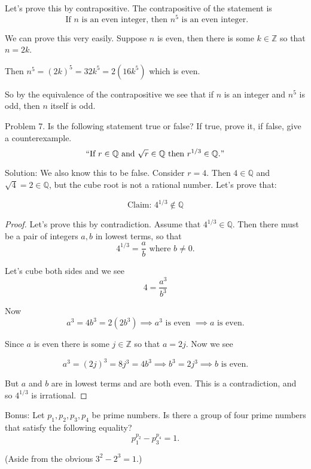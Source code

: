 \documentclass[16 pt]{amsart}
\theoremstyle{definition}
\theoremstyle{remark}
\numberwithin{equation}{subsection}
\newcommand{\Z}{\mathbb{Z}}
\newcommand{\Q}{\mathbb{Q}}
\begin{document}
Let's prove this by contrapositive.  The contrapositive of the statement is
\[
\text{ If } n \text{ is an even integer, then } n^5 \text{ is an even integer.}
\]

We can prove this very easily. Suppose $n$ is even, then there is some $k\in\Z$ so that $n=2k$.

Then $n^5 = (2k)^5 = 32k^5 = 2(16k^5)$ which is even.

So by the equivalence of the contrapositive we see that if $n$ is an integer and $n^5$ is odd, then $n$ itself is odd.


\newpage

Problem 7. Is the following statement true or false?  If true, prove it, if false, give a counterexample.
\[
\text{``If } r\in\Q \text{ and } \sqrt{r}\in\Q \text{ then } r^{1/3}\in\Q."
\]

\vspace{1in}

Solution:  We also know this to be false.  Consider $r=4$.  Then $4\in\Q$ and $\sqrt{4} = 2\in\Q$, but the cube root is not a rational number.  Let's prove that:

\[
\text{Claim: } 4^{1/3}\notin \Q
\]

\begin{proof}
Let's prove this by contradiction.  Assume that $4^{1/3}\in\Q$.  Then there must be a pair of integers $a,b$ in lowest terms, so that
\[
4^{1/3} = \frac{a}{b} \text{ where } b\ne 0.
\]


Let's cube both sides and we see
\[
4 = \frac{a^3}{b^3}
\]

Now 
\[
a^3 = 4b^3 = 2(2b^3) \implies a^3\text{ is even } \implies a \text{ is even.}
\]

Since $a$ is even there is some $j\in\Z$ so that $a=2j$.  Now we see

\[
a^3 = (2j)^3 = 8j^3 = 4b^3 \implies b^3 = 2j^3 \implies b \text{ is even}.
\]

But $a$ and $b$ are in lowest terms and are both even.  This is a contradiction, and so $4^{1/3}$ is irrational.



\end{proof}



\newpage

Bonus: Let $p_1,p_2,p_3,p_4$ be prime numbers.  Is there a group of four prime numbers that satisfy the following equality?
\[
p_1^{p_2} - p_3^{p_4} = 1.
\]

(Aside from the obvious $3^2-2^3=1$.)
\end{document}

